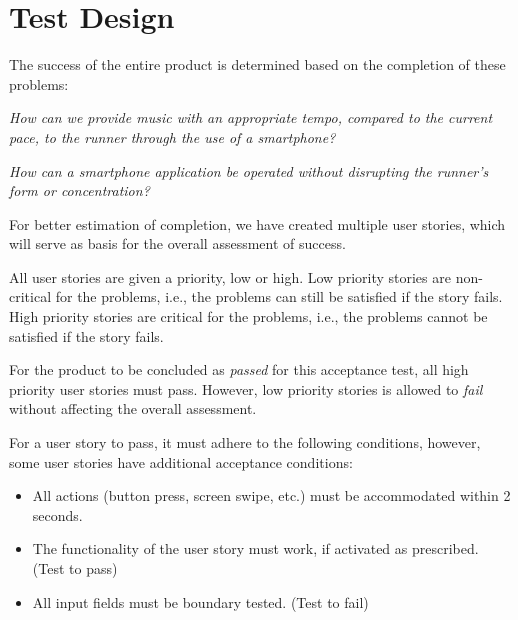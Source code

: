 \section{Test Design}
The success of the entire product is determined based on the completion of these problems: 

\begin{center}
\textit{How can we provide music with an appropriate tempo, compared to the current pace, to the runner through the use of a smartphone?}
\end{center}

\begin{center}
\textit{How can a smartphone application be operated without disrupting the runner's form or concentration?}
\end{center}

For better estimation of completion, we have created multiple user stories, which will serve as basis for the overall assessment of success.

All user stories are given a priority, low or high.
Low priority stories are non-critical for the problems, i.e., the problems can still be satisfied if the story fails. 
High priority stories are critical for the problems, i.e., the problems cannot be satisfied if the story fails. 

For the product to be concluded as \textit{passed} for this acceptance test, all high priority user stories must pass.
However, low priority stories is allowed to \textit{fail} without affecting the overall assessment.

\pagebreak
For a user story to pass, it must adhere to the following conditions, however, some user stories have additional acceptance conditions:
\begin{itemize}
\item All actions (button press, screen swipe, etc.) must be accommodated within 2 seconds.
\item The functionality of the user story must work, if activated as prescribed. (Test to pass)
\item All input fields must be boundary tested. (Test to fail)
\end{itemize}

